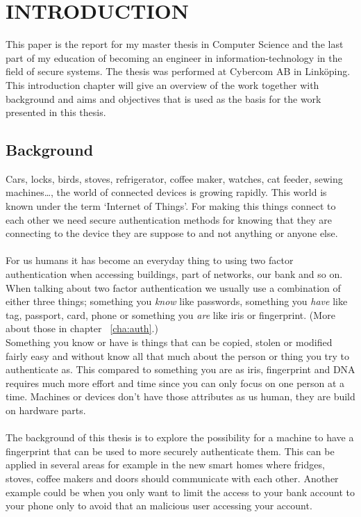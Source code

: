 \chapter{INTRODUCTION}\label{cha:intro}
This paper is the report for my master thesis in Computer Science and the last part of my education of becoming an engineer in information-technology in the field of secure systems. The thesis was performed at Cybercom AB in Linköping. \\
This introduction chapter will give an overview of the work together with background and aims and objectives that is used as the basis for the work presented in this thesis. 

\section{Background}\label{sec:bg}
Cars, locks, birds, stoves, refrigerator, coffee maker, watches, cat feeder, sewing machines\dots, the world of connected devices is growing rapidly. This world is known under the term `Internet of Things'. For making this things connect to each other we need secure authentication methods for knowing that they are connecting to the device they are suppose to and not anything or anyone else. \\
\\
For us humans it has become an everyday thing to using two factor authentication when accessing buildings, part of networks, our bank and so on. When talking about two factor authentication we usually use a combination of either three things; something you \textit{know} like passwords, something you \textit{have} like tag, passport, card, phone or something you \textit{are} like iris or fingerprint. (More about those in chapter ~\ref{cha:auth}.)  \\
Something you know or have is things that can be copied, stolen or modified fairly easy and without know all that much about the person or thing you try to authenticate as. This compared to something you are as iris, fingerprint and DNA requires much more effort and time since you can only focus on one person at a time. Machines or devices don't have those attributes as us human, they are build on hardware parts.\\ 
\\
The background of this thesis is to explore the possibility for a machine to have a fingerprint that can be used to more securely authenticate them. This can be applied in several areas for example in the new smart homes where fridges, stoves, coffee makers and doors should communicate with each other. Another example could be when you only want to limit the access to your bank account to your phone only to avoid that an malicious user accessing your account.

